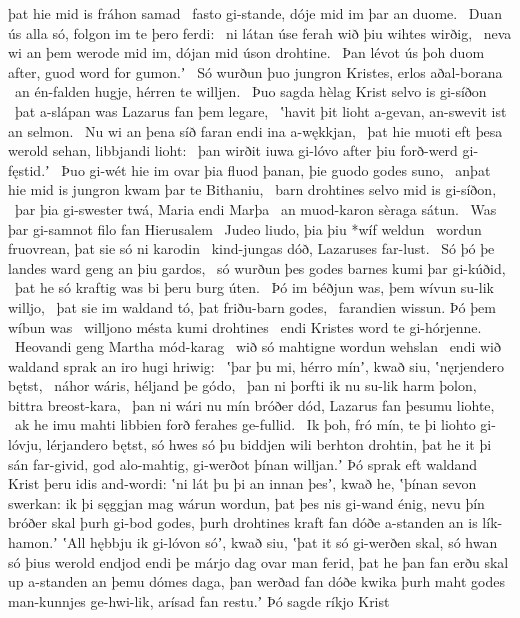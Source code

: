 þat hie mid is fráhon samad \hld\ fasto gi-stande,
dóje mid im þar an duome. \hld\ Duan ús alla só,
folgon im te þero ferdi: \hld\ ni látan úse ferah wið þiu
wihtes wirðig, \hld\ neva wi an þem werode mid im,
dójan mid úson drohtine. \hld\ Þan lévot ús þoh duom after,
guod word for gumon.ʼ \hld\ Só wurðun þuo jungron Kristes,
erlos aðal-borana \hld\ an én-falden hugje,
hérren te willjen. \hld\ Þuo sagda hèlag Krist
selvo is gi-síðon \hld\ þat a-slápan was
Lazarus fan þem legare, \hld\ ʽhavit þit lioht a-gevan,
an-swevit ist an selmon. \hld\ Nu wi an þena síð faran
endi ina a-wękkjan, \hld\ þat hie muoti eft þesa werold sehan,
libbjandi lioht: \hld\ þan wirðit iuwa gi-lóvo after þiu
forð-werd gi-fęstid.ʼ \hld\ Þuo gi-wét hie im ovar þia fluod þanan,
þie guodo godes suno, \hld\ anþat hie mid is jungron kwam
þar te Bithaniu, \hld\ barn drohtines
selvo mid is gi-síðon, \hld\ þar þia gi-swester twá,
Maria endi Marþa \hld\ an muod-karon
sèraga sátun. \hld\ Was þar gi-samnot filo
fan Hierusalem \hld\ Judeo liudo,
þia þiu *wíf weldun \hld\ wordun fruovrean,
þat sie só ni karodin \hld\ kind-jungas dóð,
Lazaruses far-lust. \hld\ Só þó þe landes ward
geng an þiu gardos, \hld\ só wurðun þes godes barnes
kumi þar gi-kúðid, \hld\ þat he só kraftig was
bi þeru burg úten. \hld\ Þó im béðjun was,
þem wívun su-lik willjo, \hld\ þat sie im waldand tó,
þat friðu-barn godes, \hld\ farandien wissun.
Þó þem wíbun was \hld\ willjono mésta
kumi drohtines \hld\ endi Kristes word
te gi-hórjenne. \hld\ Heovandi geng
Martha mód-karag \hld\ wið só mahtigne
wordun wehslan \hld\ endi wið waldand sprak
an iro hugi hriwig: \hld\ ʽþar þu mi, hérro mínʼ, kwað siu,
ʽnęrjendero bętst, \hld\ náhor wáris,
héljand þe gódo, \hld\ þan ni þorfti ik nu su-lik harm þolon,
bittra breost-kara, \hld\ þan ni wári nu mín bróðer dód,
Lazarus fan þesumu liohte, \hld\ ak he imu mahti libbien forð
ferahes ge-fullid. \hld\ Ik þoh, fró mín, te þi
liohto gi-lóvju, lérjandero bętst,
só hwes só þu biddjen wili berhton drohtin,
þat he it þi sán far-givid, god alo-mahtig,
gi-werðot þínan willjan.ʼ Þó sprak eft waldand Krist
þeru idis and-wordi: ʽni lát þu þi an innan þesʼ, kwað he,
ʽþínan sevon swerkan: ik þi sęggjan mag
wárun wordun, þat þes nis gi-wand énig,
nevu þín bróðer skal þurh gi-bod godes,
þurh drohtines kraft fan dóðe a-standen
an is lík-hamon.ʼ ʽAll hębbju ik gi-lóvon sóʼ, kwað siu,
ʽþat it só gi-werðen skal, só hwan só þius werold endjod
endi þe márjo dag ovar man ferid,
þat he þan fan erðu skal up a-standen
an þemu dómes daga, þan werðad fan dóðe kwika
þurh maht godes man-kunnjes ge-hwi-lik,
arísad fan restu.ʼ Þó sagde ríkjo Krist
